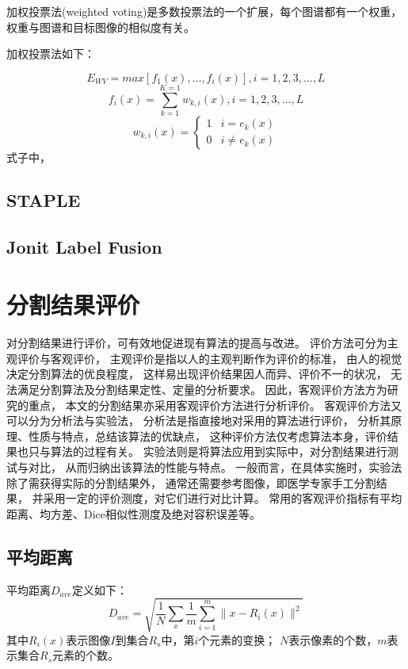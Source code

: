 加权投票法(weighted voting)是多数投票法的一个扩展，每个图谱都有一个权重，
权重与图谱和目标图像的相似度有关。

加权投票法如下：

\begin{equation}
  E_{WV}=max[f_1(x),\ldots,f_i(x)], i=1,2,3,\ldots,L
\end{equation}
\begin{equation}
  f_i(x)=\sum_{k=1}^{K=1}w_{k,i}(x), i=1,2,3,\ldots,L
\end{equation}
\begin{equation}
  w_{k,i}(x)=
  \begin{cases}
    1 & i=e_k(x)\\
    0 & i\ne e_k(x)
  \end{cases}
\end{equation}
式子中，

\subsection{STAPLE}

\subsection{Jonit Label Fusion}

\section{分割结果评价}%
对分割结果进行评价，可有效地促进现有算法的提高与改进。
评价方法可分为主观评价与客观评价，
主观评价是指以人的主观判断作为评价的标准，
由人的视觉决定分割算法的优良程度，
这样易出现评价结果因人而异、评价不一的状况，
无法满足分割算法及分割结果定性、定量的分析要求。
因此，客观评价方法方为研究的重点，
本文的分割结果亦采用客观评价方法进行分析评价。
客观评价方法又可以分为分析法与实验法，
分析法是指直接地对采用的算法进行评价，
分析其原理、性质与特点，总结该算法的优缺点，
这种评价方法仅考虑算法本身，评价结果也只与算法的过程有关。
实验法则是将算法应用到实际中，对分割结果进行测试与对比，
从而归纳出该算法的性能与特点。
一般而言，在具体实施时，实验法除了需获得实际的分割结果外，
通常还需要参考图像，即医学专家手工分割结果，
并采用一定的评价测度，对它们进行对比计算。
常用的客观评价指标有平均距离、均方差、Dice相似性测度及绝对容积误差等。
\subsection{平均距离}
平均距离$D_{ave}$定义如下：
\begin{equation}
  D_{ave}=\sqrt{\frac{1}{N}\sum_x\frac{1}{m}\sum_{i=1}^m\lVert x-R_i(x)\rVert^2}
\end{equation}
其中$R_i(x)$表示图像$I$到集合$R_s$中，第$i$个元素的变换；
$N$表示像素的个数，$m$表示集合$R_s$元素的个数。
